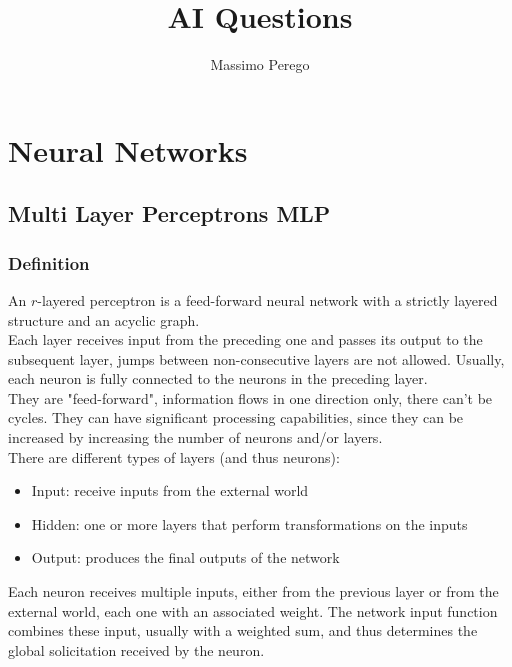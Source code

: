 \documentclass{article}
\begin{document}
	
	\title{AI Questions}
	\author{Massimo Perego}
	\date{}
	\maketitle
	
	\tableofcontents
	
	\newpage
	
	\section{Neural Networks}
	
	\subsection{Multi Layer Perceptrons MLP}
	
	\subsubsection{Definition}
	An $r$-layered perceptron is a feed-forward neural network with a strictly layered structure and an acyclic graph.\\
	
	Each layer receives input from the preceding one and passes its output to the subsequent layer, jumps between non-consecutive layers are not allowed. Usually, each neuron is fully connected to the neurons in the preceding layer. \\
	
	They are "feed-forward", information flows in one direction only, there can't be cycles. They can have significant processing capabilities, since they can be increased by increasing the number of neurons and/or layers.\\
	
	There are different types of layers (and thus neurons):
	\begin{itemize}
		\item Input: receive inputs from the external world
		\item Hidden: one or more layers that perform transformations on the inputs
		\item Output: produces the final outputs of the network
	\end{itemize}
	
	Each neuron receives multiple inputs, either from the previous layer or from the external world, each one with an associated weight. The network input function combines these input, usually with a weighted sum, and thus determines the global solicitation received by the neuron.\\
	
\end{document}

